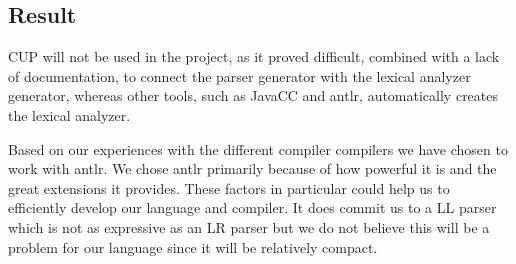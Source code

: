 
\subsection{Result}
CUP will not be used in the project, as it proved difficult, combined with a lack of documentation, to connect the parser generator with the lexical analyzer generator, whereas other tools, such as JavaCC and \gls{antlr}, automatically creates the lexical analyzer.


Based on our experiences with the different compiler compilers we have chosen to work with \gls{antlr}. We chose \gls{antlr} primarily because of how powerful it is and the great extensions it provides. These factors in particular could help us to efficiently develop our language and compiler. It does commit us to a LL parser which is not as expressive as an LR parser but we do not believe this will be a problem for our language since it will be relatively compact.
